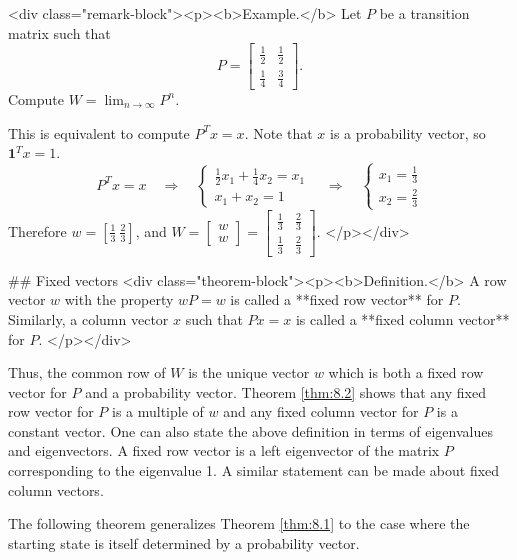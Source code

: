 <div class="remark-block"><p><b>Example.</b> 
Let $P$ be a transition matrix such that 
$$\begin{equation}
    P = \begin{bmatrix}  \frac{1}{2} & \frac{1}{2} \\ \frac{1}{4} & \frac{3}{4} \end{bmatrix}.
\end{equation}$$
Compute $W = \lim_{n\to\infty} P^n$. 

This is equivalent to compute $P^T x = x$. Note that $x$ is a probability vector, so $\mathbf{1}^T x = 1$.
$$\begin{equation}
    P^T x = x \quad \Rightarrow \quad \begin{cases} \frac{1}{2} x_1 + \frac{1}{4}x_2 = x_1 \\ x_1+x_2 = 1 \end{cases} \quad \Rightarrow \quad
    \begin{cases} x_1 = \frac{1}{3} \\ x_2 = \frac{2}{3} \end{cases}
\end{equation}$$
Therefore $w = [\frac{1}{3} \ \frac{2}{3}]$, and $W = \begin{bmatrix} w \\ w \end{bmatrix} = \begin{bmatrix} \frac{1}{3} & \frac{2}{3} \\ \frac{1}{3} & \frac{2}{3} \end{bmatrix}$.
</p></div>

## Fixed vectors
<div class="theorem-block"><p><b>Definition.</b> 
A row vector $w$ with the property $wP = w$ is called a **fixed row vector** for $P$. Similarly, a column vector $x$ such that $Px = x$ is called a **fixed column vector** for $P$.
</p></div>

Thus, the common row of $W$ is the unique vector $w$ which is both a fixed row vector for $P$ and a probability vector. Theorem \ref{thm:8.2} shows that any fixed row vector for $P$ is a multiple of $w$ and any fixed column vector for $P$ is a constant vector. One can also state the above definition in terms of eigenvalues and eigenvectors. A fixed row vector is a left eigenvector of the matrix $P$ corresponding to the eigenvalue 1. A similar statement can be made about fixed column vectors.

The following theorem generalizes Theorem \ref{thm:8.1} to the case where the starting state is itself
determined by a probability vector.

